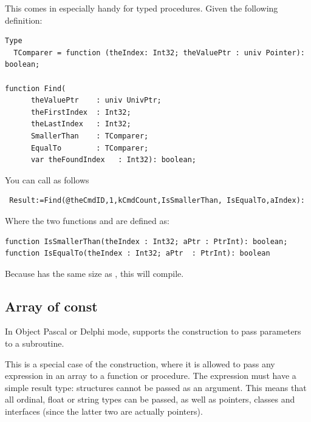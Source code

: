 This comes in especially handy for typed procedures. Given the following definition:
\begin{verbatim}
Type  
  TComparer = function (theIndex: Int32; theValuePtr : univ Pointer): boolean;

function Find(     
      theValuePtr    : univ UnivPtr;
      theFirstIndex  : Int32;
      theLastIndex   : Int32;
      SmallerThan    : TComparer;
      EqualTo        : TComparer;
      var theFoundIndex   : Int32): boolean;
\end{verbatim}
You can call  as follows
\begin{verbatim}
 Result:=Find(@theCmdID,1,kCmdCount,IsSmallerThan, IsEqualTo,aIndex):
\end{verbatim}
Where the two functions  and  are defined as:
\begin{verbatim}
function IsSmallerThan(theIndex : Int32; aPtr : PtrInt): boolean;
function IsEqualTo(theIndex : Int32; aPtr  : PtrInt): boolean
\end{verbatim}
Because  has the same size as , this will compile.

\subsection{Array of const}
In Object Pascal or Delphi mode, \fpc supports the 
construction to pass parameters to a subroutine.

This is a special case of the  construction, where it is
allowed to pass any expression in an array to a function or procedure.
The expression must have a simple result type: structures cannot be passed
as an argument. This means that all ordinal, float or string types can be
passed, as well as pointers, classes and interfaces (since the latter two
are actually pointers).

